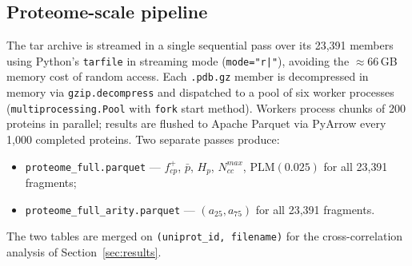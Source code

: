 \subsection{Proteome-scale pipeline}
\label{sec:methods_pipeline}

The tar archive is streamed in a single sequential pass over its 23{,}391
members using Python's \texttt{tarfile} in streaming mode
(\texttt{mode="r|"}), avoiding the ${\approx}66$\,GB memory cost of random
access.
Each \texttt{.pdb.gz} member is decompressed in memory via
\texttt{gzip.decompress} and dispatched to a pool of six worker processes
(\texttt{multiprocessing.Pool} with \texttt{fork} start method).
Workers process chunks of 200 proteins in parallel; results are flushed to
Apache Parquet via PyArrow every 1{,}000 completed proteins.
Two separate passes produce:
\begin{itemize}
  \item \texttt{proteome\_full.parquet} --- $f^+_{cp}$, $\bar{p}$, $H_p$,
        $N_{cc}^{max}$, $\mathrm{PLM}(0.025)$ for all 23{,}391 fragments;
  \item \texttt{proteome\_full\_arity.parquet} --- $(a_{25}, a_{75})$ for
        all 23{,}391 fragments.
\end{itemize}
The two tables are merged on \texttt{(uniprot\_id, filename)} for the
cross-correlation analysis of Section~\ref{sec:results}.
